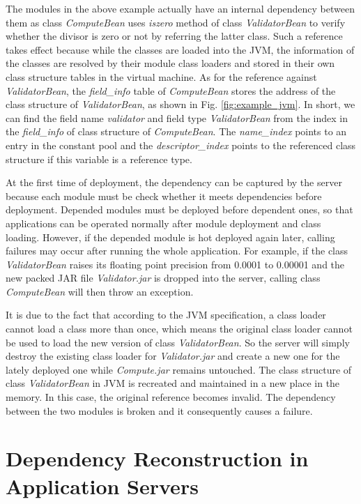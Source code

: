 \documentclass[conference]{IEEEtran}
\begin{document}
The modules in the above example actually have an internal dependency between them as class \emph{ComputeBean} uses \emph{iszero} method of class \emph{ValidatorBean} to verify whether the divisor is zero or not by referring the latter class. Such a reference takes effect because while the classes are loaded into the JVM\cite{jvm}, the information of the classes are resolved by their module class loaders and stored in their own class structure tables in the virtual machine. As for the reference against \emph{ValidatorBean}, the \emph{field\_info} table of \emph{ComputeBean} stores the address of the class structure of \emph{ValidatorBean}, as shown in Fig. \ref{fig:example_jvm}. In short, we can find the field name \emph{validator} and field type \emph{ValidatorBean} from the index in the \emph{field\_info} of class structure of \emph{ComputeBean}. 
The \emph{name\_index} points to an entry in the constant pool and the \emph{descriptor\_index} points to the referenced class structure if this variable is a reference type\cite{jvm_book}. 

At the first time of deployment, the dependency can be captured by the server because each module must be check whether it meets dependencies before deployment. Depended modules must be deployed before dependent ones, so that applications can be operated normally after module deployment and class loading. However, if the depended module is hot deployed again later, calling failures may occur after running the whole application. For example, if the class \emph{ValidatorBean} raises its floating point precision from 0.0001 to 0.00001 and the new packed JAR file \emph{Validator.jar} is dropped into the server, calling class \emph{ComputeBean} will then throw an exception. 

It is due to the fact that according to the JVM specification\cite{jvm_specification}, a class loader cannot load a class more than once, which means the original class loader cannot be used to load the new version of class \emph{ValidatorBean}. So the server will simply destroy the existing class loader for \emph{Validator.jar} and create a new one for the lately deployed one while \emph{Compute.jar} remains untouched. The class structure of class \emph{ValidatorBean} in JVM is recreated and maintained in a new place in the memory. In this case, the original reference becomes invalid. The dependency between the two modules is broken and it consequently causes a failure.


\section{Dependency Reconstruction in Application Servers\label{sec:reconstructionAS}}
\end{document}
